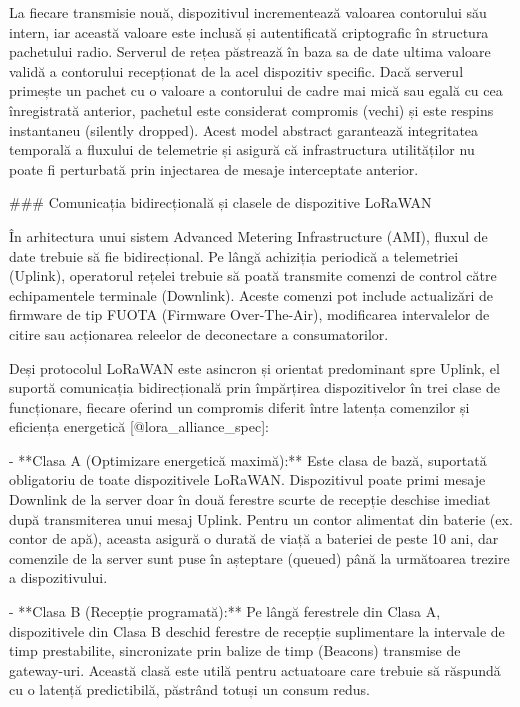 La fiecare transmisie nouă, dispozitivul incrementează valoarea
contorului său intern, iar această valoare este inclusă și autentificată
criptografic în structura pachetului radio. Serverul de rețea păstrează
în baza sa de date ultima valoare validă a contorului recepționat de la
acel dispozitiv specific. Dacă serverul primește un pachet cu o valoare
a contorului de cadre mai mică sau egală cu cea înregistrată anterior,
pachetul este considerat compromis (vechi) și este respins instantaneu
(silently dropped). Acest model abstract garantează integritatea
temporală a fluxului de telemetrie și asigură că infrastructura
utilităților nu poate fi perturbată prin injectarea de mesaje
interceptate anterior.

### Comunicația bidirecțională și clasele de dispozitive LoRaWAN

În arhitectura unui sistem Advanced Metering Infrastructure (AMI),
fluxul de date trebuie să fie bidirecțional. Pe lângă achiziția
periodică a telemetriei (Uplink), operatorul rețelei trebuie să poată
transmite comenzi de control către echipamentele terminale (Downlink).
Aceste comenzi pot include actualizări de firmware de tip FUOTA
(Firmware Over-The-Air), modificarea intervalelor de citire sau
acționarea releelor de deconectare a consumatorilor.

Deși protocolul LoRaWAN este asincron și orientat predominant spre
Uplink, el suportă comunicația bidirecțională prin împărțirea
dispozitivelor în trei clase de funcționare, fiecare oferind un
compromis diferit între latența comenzilor și eficiența energetică
[@lora_alliance_spec]:

- **Clasa A (Optimizare energetică maximă):** Este clasa de bază,
  suportată obligatoriu de toate dispozitivele LoRaWAN. Dispozitivul
  poate primi mesaje Downlink de la server doar în două ferestre scurte
  de recepție deschise imediat după transmiterea unui mesaj Uplink.
  Pentru un contor alimentat din baterie (ex. contor de apă), aceasta
  asigură o durată de viață a bateriei de peste 10 ani, dar comenzile de
  la server sunt puse în așteptare (queued) până la următoarea trezire a
  dispozitivului.

- **Clasa B (Recepție programată):** Pe lângă ferestrele din Clasa A,
  dispozitivele din Clasa B deschid ferestre de recepție suplimentare la
  intervale de timp prestabilite, sincronizate prin balize de timp
  (Beacons) transmise de gateway-uri. Această clasă este utilă pentru
  actuatoare care trebuie să răspundă cu o latență predictibilă,
  păstrând totuși un consum redus.

